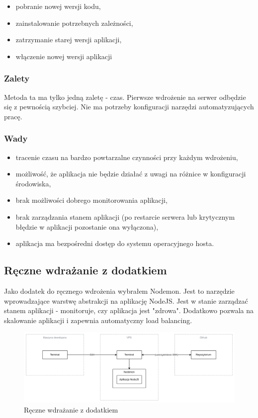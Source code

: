 \documentclass{article}
\begin{document}
\begin{itemize}
    \item pobranie nowej wersji kodu,
    \item zainstalowanie potrzebnych zależności,
    \item zatrzymanie starej wersji aplikacji,
    \item włączenie nowej wersji aplikacji
\end{itemize}

\subsubsection{Zalety}

Metoda ta ma tylko jedną zaletę - czas. Pierwsze wdrożenie na serwer odbędzie się z pewnością szybciej. Nie ma potrzeby konfiguracji narzędzi automatyzujących pracę.

\subsubsection{Wady}

\begin{itemize}
    \item tracenie czasu na bardzo powtarzalne czynności przy każdym wdrożeniu,
    \item możliwość, że aplikacja nie będzie działać z uwagi na różnice w konfiguracji środowiska,
    \item brak możliwości dobrego monitorowania aplikacji,
    \item brak zarządzania stanem aplikacji (po restarcie serwera lub krytycznym błędzie w aplikacji pozostanie ona wyłączona),
    \item aplikacja ma bezpośredni dostęp do systemu operacyjnego hosta.
\end{itemize}

\subsection{Ręczne wdrażanie z dodatkiem}

Jako dodatek do ręcznego wdrożenia wybrałem Nodemon. Jest to narzędzie wprowadzające warstwę abstrakcji na aplikację NodeJS. Jest w stanie zarządzać stanem aplikacji - monitoruje, czy aplikacja jest "zdrowa". Dodatkowo pozwala na skalowanie aplikacji i zapewnia automatyczny load balancing. 

\begin{figure}[H]
    \centering
    \includegraphics[width=1\linewidth]{reczneWdrazanieZDodatkiem.png}
    \caption{Ręczne wdrażanie z dodatkiem}
    \label{fig:enter-label}
\end{figure}
\end{document}
